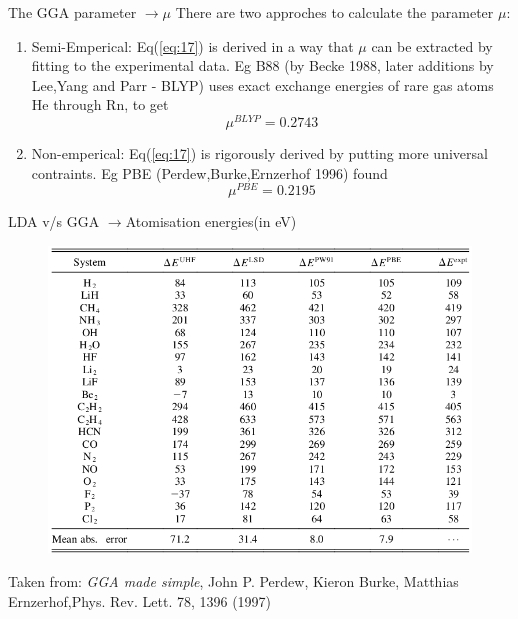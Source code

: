 \documentclass{beamer}
\begin{document}
	\begin{frame}[t]{The GGA parameter $\rightarrow \mu$}
	There are two approches to calculate the parameter $\mu$:\pause
	\begin{enumerate}
	\item{Semi-Emperical: } Eq(\ref{eq:17}) is derived in a way that $\mu$ can be extracted by fitting to the experimental data. Eg B88 (by Becke 1988, later additions by Lee,Yang and Parr - BLYP) uses exact exchange energies of rare gas atoms He through Rn, to get 
	\begin{equation}\label{eq:19}
	\mu^{BLYP} = 0.2743
	\end{equation}\pause
	\item{Non-emperical:} Eq(\ref{eq:17}) is rigorously derived by putting more universal contraints. Eg PBE (Perdew,Burke,Ernzerhof 1996) found
	\begin{equation}\label{eq:20}
	\mu^{PBE} = 0.2195
	\end{equation}\pause
	\end{enumerate}
	\end{frame}
	
	\begin{frame}[t]{LDA v/s GGA $\rightarrow$Atomisation energies(in eV)}
	\begin{figure}
	\centering
	\includegraphics[scale=0.35]{Atomisation_energies_table.png}
	\end{figure}
	Taken from: \textit{GGA made simple}, John P. Perdew, Kieron Burke, Matthias Ernzerhof,Phys. Rev. Lett. 78, 1396 (1997)
	\end{frame}
	
\end{document}
